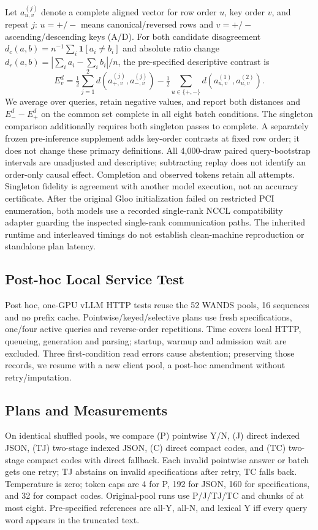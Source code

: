 \documentclass[conference]{IEEEtran}
\newcommand{\indicator}{\mathbf{1}}
\begin{document}
Let $a_{u,v}^{(j)}$ denote a complete aligned vector for row order $u$, key order $v$, and repeat $j$: $u=+/-$ means canonical/reversed rows and $v=+/-$ ascending/descending keys (A/D). For both candidate disagreement $d_c(a,b)=n^{-1}\sum_i\indicator[a_i\ne b_i]$ and absolute ratio change $d_r(a,b)=|\sum_i a_i-\sum_i b_i|/n$, the pre-specified descriptive contrast is
\begin{equation}
E_v^d=\tfrac12\sum_{j=1}^2 d(a_{+,v}^{(j)},a_{-,v}^{(j)})
-\tfrac12\sum_{u\in\{+,-\}}d(a_{u,v}^{(1)},a_{u,v}^{(2)}).
\label{eq:excess}
\end{equation}
We average over queries, retain negative values, and report both distances and $E_-^d-E_+^d$ on the common set complete in all eight batch conditions. The singleton comparison additionally requires both singleton passes to complete. A separately frozen pre-inference supplement adds key-order contrasts at fixed row order; it does not change these primary definitions. All 4,000-draw paired query-bootstrap intervals are unadjusted and descriptive; subtracting replay does not identify an order-only causal effect. Completion and observed tokens retain all attempts. Singleton fidelity is agreement with another model execution, not an accuracy certificate. After the original Gloo initialization failed on restricted PCI enumeration, both models use a recorded single-rank NCCL compatibility adapter guarding the inspected single-rank communication paths. The inherited runtime and interleaved timings do not establish clean-machine reproduction or standalone plan latency.

\subsection{Post-hoc Local Service Test}
Post hoc, one-GPU vLLM HTTP tests reuse the 52 WANDS pools, 16 sequences and no prefix cache. Pointwise/keyed/selective plans use fresh specifications, one/four active queries and reverse-order repetitions. Time covers local HTTP, queueing, generation and parsing; startup, warmup and admission wait are excluded. Three first-condition read errors cause abstention; preserving those records, we resume with a new client pool, a post-hoc amendment without retry/imputation.

\subsection{Plans and Measurements}
On identical shuffled pools, we compare (P) pointwise Y/N, (J) direct indexed JSON, (TJ) two-stage indexed JSON, (C) direct compact codes, and (TC) two-stage compact codes with direct fallback. Each invalid pointwise answer or batch gets one retry; TJ abstains on invalid specifications after retry, TC falls back. Temperature is zero; token caps are 4 for P, 192 for JSON, 160 for specifications, and 32 for compact codes. Original-pool runs use P/J/TJ/TC and chunks of at most eight. Pre-specified references are all-Y, all-N, and lexical Y iff every query word appears in the truncated text.
\end{document}
